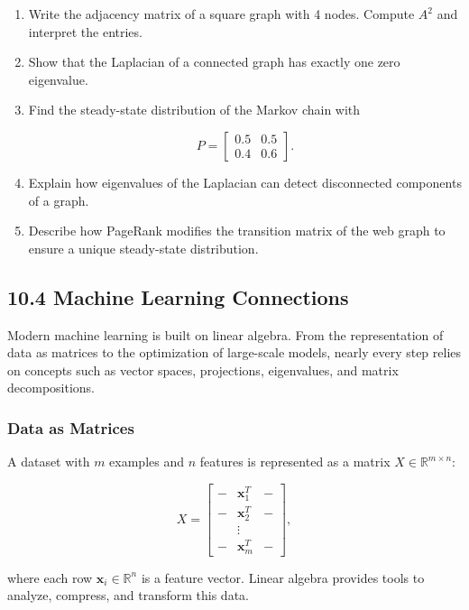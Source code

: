 \documentclass[
  12pt,
  a4paper,
]{article}
\begin{document}
\begin{enumerate}
\def\labelenumi{\arabic{enumi}.}
\item
  Write the adjacency matrix of a square graph with 4 nodes. Compute
  \(A^2\) and interpret the entries.
\item
  Show that the Laplacian of a connected graph has exactly one zero
  eigenvalue.
\item
  Find the steady-state distribution of the Markov chain with

  \[P = \begin{bmatrix} 0.5 & 0.5 \\ 0.4 & 0.6 \end{bmatrix}.\]
\item
  Explain how eigenvalues of the Laplacian can detect disconnected
  components of a graph.
\item
  Describe how PageRank modifies the transition matrix of the web graph
  to ensure a unique steady-state distribution.
\end{enumerate}

\subsection{10.4 Machine Learning
Connections}\label{104-machine-learning-connections}

Modern machine learning is built on linear algebra. From the
representation of data as matrices to the optimization of large-scale
models, nearly every step relies on concepts such as vector spaces,
projections, eigenvalues, and matrix decompositions.

\subsubsection{Data as Matrices}\label{data-as-matrices}

A dataset with \(m\) examples and \(n\) features is represented as a
matrix \(X \in \mathbb{R}^{m \times n}\):

\[X = 
\begin{bmatrix}
- & \mathbf{x}_1^T & - \\
- & \mathbf{x}_2^T & - \\
  & \vdots &  \\
- & \mathbf{x}_m^T & -
\end{bmatrix},\]

where each row \(\mathbf{x}_i \in \mathbb{R}^n\) is a feature vector.
Linear algebra provides tools to analyze, compress, and transform this
data.
\end{document}

